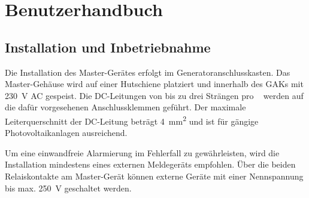 \chapter{Benutzerhandbuch}
\label{chap:userguide}

\noindent{}
\noindent{}

\section{Installation und Inbetriebnahme}
\label{sec:userguide:installation}

Die Installation des Master-Ger\"ates erfolgt im Generatoranschlusskasten. Das
Master-Geh\"ause  wird  auf  einer  Hutschiene  platziert  und  innerhalb  des
GAKs  mit  \SI{230}{\volt}  AC  gespeist. Die DC-Leitungen  von  bis  zu  drei
Str\"angen pro  \Master~ werden auf die  daf\"ur vorgesehenen Anschlussklemmen
gef\"uhrt. Der   maximale    Leiterquerschnitt   der    DC-Leitung   betr\"agt
\SI{4}{\milli\meter\squared}  und  ist   f\"ur  g\"angige  Photovoltaikanlagen
ausreichend.

Um eine  einwandfreie Alarmierung im  Fehlerfall zu gew\"ahrleisten,  wird die
Installation  mindestens eines  externen  Meldeger\"ats empfohlen. \"Uber  die
beiden Relaiskontakte  am Master-Ger\"at  k\"onnen externe Ger\"ate  mit einer
Nennspannung bis max. \SI{250}{\volt}  geschaltet werden.

